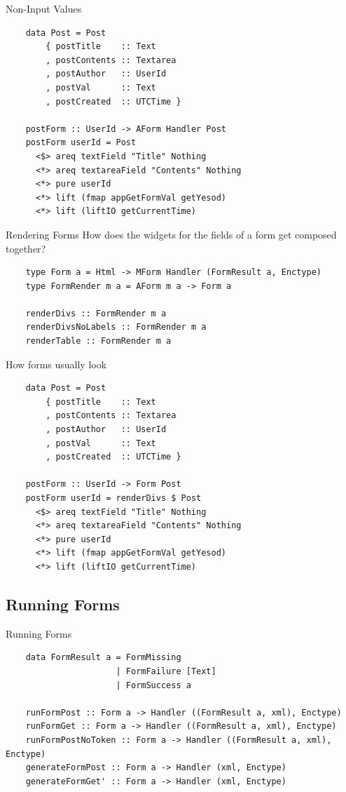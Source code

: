 \documentclass[pdf]{beamer}
\begin{document}
\begin{frame}[fragile]{Non-Input Values}
  \begin{verbatim}
    data Post = Post
        { postTitle    :: Text
        , postContents :: Textarea
        , postAuthor   :: UserId
        , postVal      :: Text
        , postCreated  :: UTCTime }

    postForm :: UserId -> AForm Handler Post
    postForm userId = Post
      <$> areq textField "Title" Nothing
      <*> areq textareaField "Contents" Nothing
      <*> pure userId
      <*> lift (fmap appGetFormVal getYesod)
      <*> lift (liftIO getCurrentTime)
  \end{verbatim}
\end{frame}

\begin{frame}[fragile]{Rendering Forms}
  How does the widgets for the fields of a form get composed together?
  \pause
  \begin{verbatim}
    type Form a = Html -> MForm Handler (FormResult a, Enctype)
    type FormRender m a = AForm m a -> Form a

    renderDivs :: FormRender m a
    renderDivsNoLabels :: FormRender m a
    renderTable :: FormRender m a
  \end{verbatim}
\end{frame}

\begin{frame}[fragile]{How forms usually look}
  \begin{verbatim}
    data Post = Post
        { postTitle    :: Text
        , postContents :: Textarea
        , postAuthor   :: UserId
        , postVal      :: Text
        , postCreated  :: UTCTime }

    postForm :: UserId -> Form Post
    postForm userId = renderDivs $ Post
      <$> areq textField "Title" Nothing
      <*> areq textareaField "Contents" Nothing
      <*> pure userId
      <*> lift (fmap appGetFormVal getYesod)
      <*> lift (liftIO getCurrentTime)
  \end{verbatim}
\end{frame}

\subsection{Running Forms}
\begin{frame}[fragile]{Running Forms}
  \begin{verbatim}
    data FormResult a = FormMissing
                      | FormFailure [Text]
                      | FormSuccess a
    
    runFormPost :: Form a -> Handler ((FormResult a, xml), Enctype)
    runFormGet :: Form a -> Handler ((FormResult a, xml), Enctype)
    runFormPostNoToken :: Form a -> Handler ((FormResult a, xml), Enctype)
    generateFormPost :: Form a -> Handler (xml, Enctype)
    generateFormGet' :: Form a -> Handler (xml, Enctype)
  \end{verbatim}
\end{frame}
\end{document}
